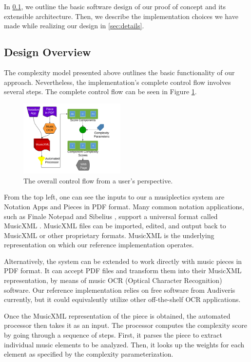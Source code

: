 \documentclass[10pt,preprint]{sigplanconf}
\begin{document}
In \ref{sec:design}, we outline the basic software design of our proof of concept and its extensible architecture. Then, we describe the implementation choices we have made while realizing our design in \ref{sec:details}.

\subsection{Design Overview} 
\label{sec:design}

The complexity model presented above outlines the basic functionality of our approach. Nevertheless, the implementation's complete control flow involves several steps. The complete control flow can be seen in Figure \ref{image:flow}.

\begin{figure}[ht!]
	\centering
		\includegraphics[width=0.47\textwidth]{JoinedCropped.png}
		\caption{The overall control flow from a user's perspective.}
		\label{image:flow}
\end{figure}

From the top left, one can see the inputs to our a musiplectics system are Notation Apps and Pieces in PDF format. Many common notation applications, such as Finale Notepad \cite{FinaleNotepad} and Sibelius \cite{Sibelius}, support a universal format called MusicXML \cite{MusicXML} \cite{Good2001}. MusicXML files can be imported, edited, and output back to MusicXML or other proprietary formats. MusicXML is the underlying representation on which our reference implementation operates.

Alternatively, the system can be extended to work directly with music pieces in PDF format. It can accept PDF files and transform them into their MusicXML representation, by means of music OCR (Optical Character Recognition) software. Our reference implementation relies on free software from Audiveris \cite{Audiveris} currently, but it could equivalently utilize other off-the-shelf OCR applications.

Once the MusicXML representation of the piece is obtained, the automated processor then takes it as an input. The processor computes the complexity score by going through a sequence of steps. First, it parses the piece to extract individual music elements to be analyzed. Then, it looks up the weights for each element as specified by the complexity parameterization.
\end{document}
